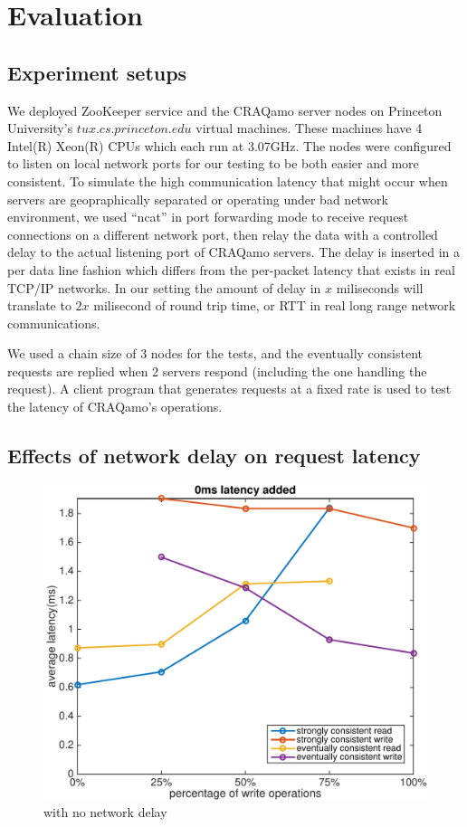 \section{Evaluation}
\label{sec:eval}

\subsection{Experiment setups}
We deployed ZooKeeper service and the CRAQamo server nodes on Princeton University's $tux.cs.princeton.edu$ virtual machines.
These machines have 4 Intel(R) Xeon(R) CPUs which each run at 3.07GHz. The nodes were configured to listen on local network ports for our testing to be both easier and more consistent. To simulate the high communication latency that might occur when servers are geopraphically separated or operating under bad network environment, we used ``ncat'' in port forwarding mode to receive request connections on a different network port, then relay the data with a controlled delay to the actual listening port of CRAQamo servers. The delay is inserted in a per data line fashion which differs from the per-packet latency that exists in real TCP/IP networks. In our setting the amount of delay in $x$ miliseconds will
translate to $2x$ milisecond of round trip time, or RTT in real long range network communications. 

We used a chain size of 3 nodes for the tests, and the eventually consistent requests are replied when 2 servers respond (including the one handling the request). A client program that generates requests at a fixed rate is used to test the latency of CRAQamo's operations. 

\subsection{Effects of network delay on request latency}
\vspace{-5mm}
\begin{figure}[hbt]
\centering
\includegraphics[width=\linewidth]{figures/latency_0.pdf}
\caption{with no network delay}
\label{fig:latency_0}
\end{figure}


